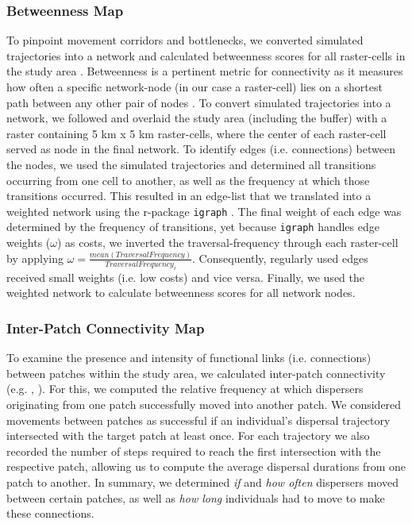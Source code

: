 \documentclass[abstract=on,10pt,a4paper,bibliography=totocnumbered]{article}
\begin{document}
\subsubsection{Betweenness Map}
To pinpoint movement corridors and bottlenecks, we converted simulated
trajectories into a network and calculated betweenness scores for all
raster-cells in the study area \citep{BastilleRousseau.2018}. Betweenness is a
pertinent metric for connectivity as it measures how often a specific
network-node (in our case a raster-cell) lies on a shortest path between any
other pair of nodes \citep{BastilleRousseau.2018}. To convert simulated
trajectories into a network, we followed \cite{BastilleRousseau.2018} and
overlaid the study area (including the buffer) with a raster containing 5 km x 5
km raster-cells, where the center of each raster-cell served as node in the
final network. To identify edges (i.e. connections) between the nodes, we used
the simulated trajectories and determined all transitions occurring from one
cell to another, as well as the frequency at which those transitions occurred.
This resulted in an edge-list that we translated into a weighted network using
the r-package {\tt igraph} \citep{Gabor.2006}. The final weight of each edge was
determined by the frequency of transitions, yet because {\tt igraph} handles
edge weights (\(\omega\)) as costs, we inverted the traversal-frequency through
each raster-cell by applying \(\omega = \frac{mean(Traversal
Frequency)}{Traversal Frequency_i}\). Consequently, regularly used edges
received small weights (i.e. low costs) and vice versa. Finally, we used the
weighted network to calculate betweenness scores for all network nodes.

\subsubsection{Inter-Patch Connectivity Map}
To examine the presence and intensity of functional links (i.e. connections)
between patches within the study area, we calculated inter-patch connectivity
(e.g. \citealp{Gustafson.1996}, \citealp{Kanagaraj.2013}). For this, we computed
the relative frequency at which dispersers originating from one patch
successfully moved into another patch. We considered movements between patches
as successful if an individual's dispersal trajectory intersected with the
target patch at least once. For each trajectory we also recorded the number of
steps required to reach the first intersection with the respective patch,
allowing us to compute the average dispersal durations from one patch to
another. In summary, we determined \textit{if} and \textit{how often} dispersers
moved between certain patches, as well as \textit{how long} individuals had to
move to make these connections.
\end{document}
